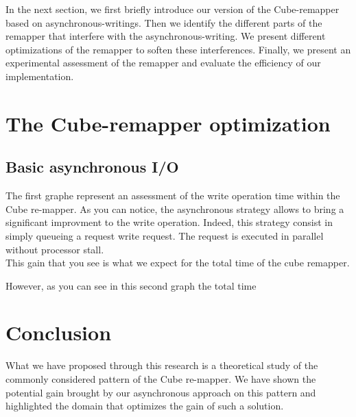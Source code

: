 \documentclass[12pt]{article}											%
\begin{document}
	In the next section, we first briefly introduce our version of the Cube-remapper based on asynchronous-writings.   Then we identify the different parts of the remapper that interfere with the asynchronous-writing.   We present different optimizations of the remapper to soften these interferences.   Finally, we present an experimental assessment of the remapper and evaluate the efficiency of our implementation.\\


\section{The Cube-remapper optimization}
	\subsection{Basic asynchronous I/O}
	The first graphe represent an assessment of the write operation time within the Cube re-mapper.   As you can notice, the asynchronous strategy allows to bring a significant improvment to the write operation.   Indeed, this strategy consist in simply queueing a request write request.   The request is executed in parallel without processor stall.\\
	This gain that you see is what we expect for the total time of the cube remapper.

	However, as you can see in this second graph the total time



\section{Conclusion}
	What we have proposed through this research is a theoretical study of the commonly considered pattern of the Cube re-mapper.   We have shown the potential gain brought by our asynchronous approach on this pattern and highlighted the domain that optimizes the gain of such a solution.\\
\end{document}
